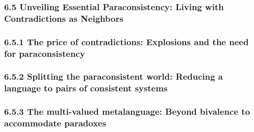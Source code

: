 \hypertarget{unveiling-essential-paraconsistency-living-with-contradictions-as-neighbors}{%
\subsubsection*{\texorpdfstring{\textbf{6.5 Unveiling Essential
Paraconsistency: Living with Contradictions as Neighbors}
}{6.5 Unveiling Essential Paraconsistency: Living with Contradictions as Neighbors }}\label{unveiling-essential-paraconsistency-living-with-contradictions-as-neighbors}}

\hypertarget{the-price-of-contradictions-explosions-and-the-need-for-paraconsistency}{%
\subsubsection*{\texorpdfstring{6.5.1 The price of contradictions:
Explosions and the need for paraconsistency
}{6.5.1 The price of contradictions: Explosions and the need for paraconsistency }}\label{the-price-of-contradictions-explosions-and-the-need-for-paraconsistency}}

\hypertarget{splitting-the-paraconsistent-world-reducing-a-language-to-pairs-of-consistent-systems}{%
\subsubsection*{\texorpdfstring{6.5.2 Splitting the paraconsistent
world: Reducing a language to pairs of consistent systems
}{6.5.2 Splitting the paraconsistent world: Reducing a language to pairs of consistent systems }}\label{splitting-the-paraconsistent-world-reducing-a-language-to-pairs-of-consistent-systems}}

\hypertarget{the-multi-valued-metalanguage-beyond-bivalence-to-accommodate-paradoxes}{%
\subsubsection*{\texorpdfstring{6.5.3 The multi-valued metalanguage:
Beyond bivalence to accommodate paradoxes
}{6.5.3 The multi-valued metalanguage: Beyond bivalence to accommodate paradoxes }}\label{the-multi-valued-metalanguage-beyond-bivalence-to-accommodate-paradoxes}}

